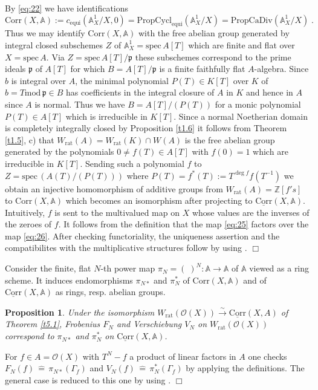 \documentclass[12pt,leqno]{article}
\newcommand{\A}{{\mathbb{A}}}
\newcommand{\Z}{{\mathbb{Z}}}
\newcommand{\Corr}{\mathrm{Corr}}
\newcommand{\uCorr}{\underline{\Corr}}
\newcommand{\equi}{\mathrm{equi}}
\renewcommand{\mod}{\mathrm{mod}\,}
\newcommand{\spec}{\mathrm{spec}\,}
\newcommand{\PropCycl}{\mathrm{PropCycl}}
\newcommand{\PropCaDir}{\mathrm{PropCaDiv}}
\newcommand{\rat}{\mathrm{rat}}
\newcommand{\Oh}{{\mathcal O}}
\newcommand{\ep}{\mathfrak{p}}
\newcommand{\silo}{\stackrel{\sim}{\rightarrow}}
\newcommand{\ent}{\,\hat{=}\,}
\newtheorem{prop}[theorem]{Proposition}
\newenvironment{proof}{\noindent {\bf Proof}}{\mbox{}\hspace*{\fill}$\Box$}
\begin{document}
\begin{proof}
By \eqref{eq:22} we have identifications
\[
\Corr (X, \A) := c_{\equi} (\A^1_X / X , 0) = \PropCycl_{\equi} (\A^1_X / X) = \PropCaDir (\A^1_X / X) \; .
\]
Thus we may identify $\Corr (X , \A)$ with the free abelian group generated by integral closed subschemes $Z$ of $\A^1_X = \spec A [T]$ which are finite and flat over $X = \spec A$. Via $Z = \spec A [T] / \ep$ these subschemes correspond to the prime ideals $\ep$ of $A [T]$ for which $B = A [T] / \ep$ is a finite faithfully flat $A$-algebra. Since $b$ is integral over $A$, the minimal polynomial $P (T) \in K [T]$ over $K$ of $b = T \mod \ep \in B$ has coefficients in the integral closure of $A$ in $K$ and hence in $A$ since $A$ is normal. Thus we have $B = A [T] / (P (T))$ for a monic polynomial $P (T) \in A [T]$ which is irreducible in $K [T]$. Since a normal Noetherian domain is completely integrally closed by Proposition \ref{t1.6} it follows from Theorem \ref{t1.5}, c) that $W_{\rat} (A) = W_{\rat} (K) \cap W (A)$ is the free abelian group generated by the polynomials $0 \neq f (T) \in A [T]$ with $f (0) = 1$ which are irreducible in $K [T]$. Sending such a polynomial $f$ to $Z = \spec (A (T) / (P (T)))$ where $P (T) = f^* (T) := T^{\deg f} f (T^{-1})$ we obtain an injective homomorphism of additive groups from $W_{\rat} (A) = \Z [f's]$ to $\Corr (X , \A)$ which becomes an isomorphism after projecting to $\uCorr (X , \A)$. Intuitively, $f$ is sent to the multivalued map on $X$ whose values are the inverses of the zeroes of $f$. It follows from the definition that the map \eqref{eq:25} factors over the map \eqref{eq:26}. After checking functoriality, the uniqueness assertion and the compatibilites with the multiplicative structures follow by using \cite[Lemma 10.136.14]{stacks}.
\end{proof}

Consider the finite, flat $N$-th power map $\pi_N = (\;)^N : \A \to \A$ of $\A$ viewed as a ring scheme. It induces endomorphisms $\pi_{N*}$ and $\pi^*_N$ of $\Corr (X, \A)$ and of $\uCorr (X, \A)$ as rings, resp. abelian groups.

\begin{prop}
\label{t5.2}
Under the isomorphism $W_{\rat} (\Oh (X)) \silo \uCorr (X, A)$ of Theorem \ref{t5.1}, Frobenius $F_N$ and Verschiebung $V_N$ on $W_{\rat} (\Oh (X))$ correspond to $\pi_{N*}$ and $\pi^*_N$ on $\uCorr (X , \A)$.
\end{prop}

\begin{proof}
For $f \in A = \Oh (X)$ with $T^N- f$ a product of linear factors in $A$ one checks $F_N (f) \ent \pi_{N*} (\Gamma_f)$ and $V_N (f) \ent \pi^*_N (\Gamma_f)$ by applying the definitions. The general case is reduced to this one by using \cite[Lemma 10.136.14]{stacks}.
\end{proof}
\end{document}
